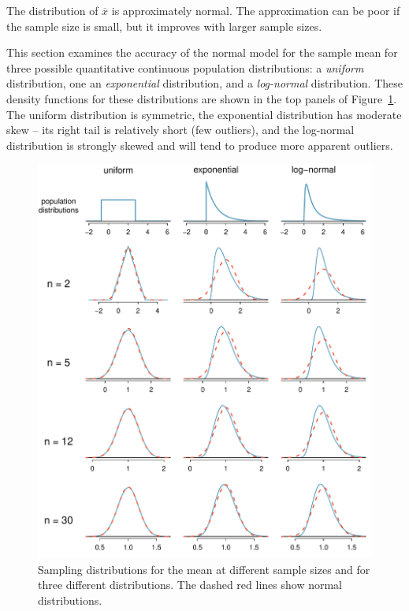\begin{spacing}{1.5}
\begin{termBox}{
The distribution of $\overline{x}$ is approximately normal. The approximation can be poor if the sample size is small, but it improves with larger sample sizes.}
\end{termBox}


This section examines the accuracy of the normal model for the sample mean for three possible quantitative continuous population distributions:  a \emph{uniform} distribution, one an \emph{exponential} distribution, and a \emph{log-normal} distribution. These density functions for these distributions are shown in the top panels of Figure~\ref{cltSimulations}. The uniform distribution is symmetric, the exponential distribution has moderate skew -- its right tail is relatively short (few outliers), and the log-normal distribution is strongly skewed and will tend to produce more apparent outliers.

\begin{figure}
   \centering
   \includegraphics[width=\textwidth]{ch_inference_foundations_oi_biostat/figures/cltSimulations/cltSimulations}
   \caption{Sampling distributions for the mean at different sample sizes and for three different distributions. The dashed red lines show normal distributions.}
   \label{cltSimulations}
\end{figure}


\end{spacing}
